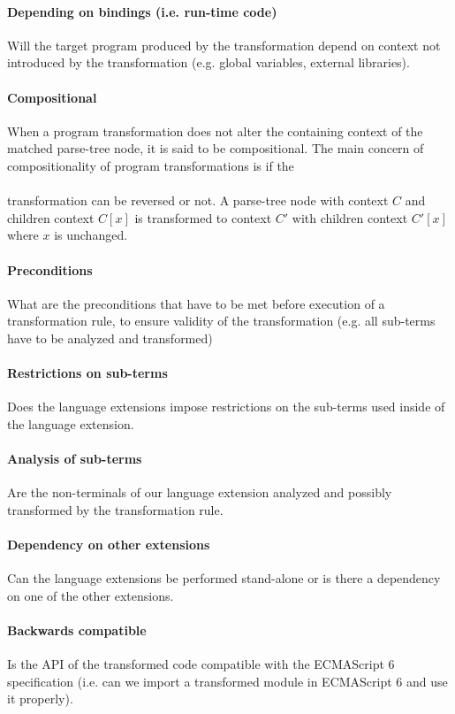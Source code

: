 \paragraph{Depending on bindings (i.e. run-time code)}
Will the target program produced by the transformation depend on context not introduced by the transformation (e.g. global variables, external libraries).

\paragraph{Compositional}
When a program transformation does not alter the containing context of the matched parse-tree node, it is said to be compositional. The main concern of compositionality of program transformations is if the 
\\
\\
transformation can be reversed or not. 
A parse-tree node with context $C$ and children context $C[x]$ is transformed to context $C'$ with children context $C'[x]$ where $x$ is unchanged.

\paragraph{Preconditions}
What are the preconditions that have to be met before execution of a transformation rule, to ensure validity of the transformation (e.g. all sub-terms have to be analyzed and transformed)

\paragraph{Restrictions on sub-terms}
Does the language extensions impose restrictions on the sub-terms used inside of the language extension. 

\paragraph{Analysis of sub-terms}
Are the non-terminals of our language extension analyzed and possibly transformed by the transformation rule.

\paragraph{Dependency on other extensions}
Can the language extensions be performed stand-alone or is there a dependency on one of the other extensions.

\paragraph{Backwards compatible}
Is the API of the transformed code compatible with the ECMAScript 6 specification (i.e. can we import a transformed module in ECMAScript 6 and use it properly).

